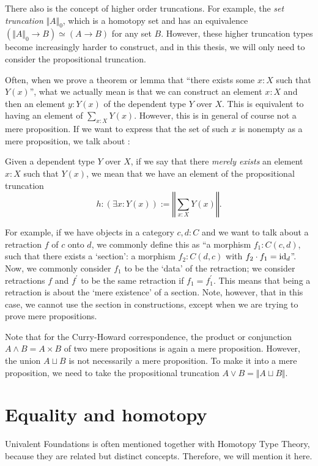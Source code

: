 There also is the concept of higher order truncations. For example, the \textit{set truncation} $ \Vert A \Vert_0 $, which is a homotopy set and has an equivalence $ (\Vert A \Vert_0 \to B) \simeq (A \to B) $ for any set $ B $. However, these higher truncation types become increasingly harder to construct, and in this thesis, we will only need to consider the propositional truncation.

Often, when we prove a theorem or lemma that ``there exists some $ x: X $ such that $ Y(x) $'', what we actually mean is that we can construct an element $ x: X $ and then an element $ y : Y(x) $ of the dependent type $ Y $ over $ X $. This is equivalent to having an element of $ \sum_{x: X} Y(x) $. However, this is in general of course not a mere proposition. If we want to express that the set of such $ x $ is nonempty as a mere proposition, we talk about :
\begin{definition}
  Given a dependent type $ Y $ over $ X $, if we say that there \textit{merely exists} an element $ x: X $ such that $ Y(x) $, we mean that we have an element of the propositional truncation
  \[ h: \left(\exists x: Y(x)\right) := \left\Vert \sum_{x: X} Y(x) \right\Vert. \]
\end{definition}

For example, if we have objects in a category $ c, d: C $ and we want to talk about a retraction $ f $ of $ c $ onto $ d $, we commonly define this as ``a morphism $ f_1: C(c, d) $, such that there exists a `section': a morphism $ f_2: C(d, c) $ with $ f_2 \cdot f_1 = \text{id}_{d} $''. Now, we commonly consider $ f_1 $ to be the `data' of the retraction; we consider retractions $ f $ and $ f^\prime $ to be the same retraction if $ f_1 = f^\prime_1 $. This means that being a retraction is about the `mere existence' of a section. Note, however, that in this case, we cannot use the section in constructions, except when we are trying to prove mere propositions.

Note that for the Curry-Howard correspondence, the product or conjunction $ A \land B = A \times B $ of two mere propositions is again a mere proposition. However, the union $ A \sqcup B $ is not necessarily a mere proposition. To make it into a mere proposition, we need to take the propositional truncation $ A \lor B = \Vert A \sqcup B \Vert $.

\section{Equality and homotopy}
Univalent Foundations is often mentioned together with Homotopy Type Theory, because they are related but distinct concepts. Therefore, we will mention it here.

